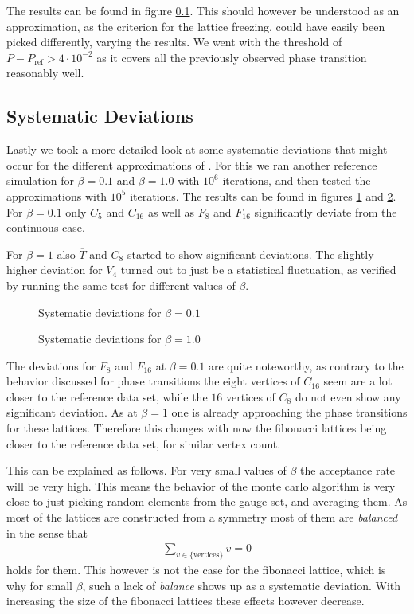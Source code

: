 The results can be found in figure \ref{}. This should however be understood as an approximation, as the criterion for the lattice freezing, could have easily been picked differently, varying the results. We went with the threshold of $P-P_{\textrm{ref}} > 4 \cdot 10^{-2}$ as it covers all the previously observed phase transition reasonably well.

\subsection{Systematic Deviations}
\FloatBarrier

Lastly we took a more detailed look at some systematic deviations that might occur for the different approximations of \SUTwo. For this we ran another reference simulation for $\beta = 0.1$ and $\beta = 1.0$ with $10^6$ iterations, and then tested the approximations with $10^5$ iterations. The results can be found in figures \ref{plot:systemBeta01} and \ref{plot:systemBeta10}. For $\beta=0.1$ only $C_5$ and $C_{16}$ as well as $F_{8}$ and $F_{16}$ significantly deviate from the continuous case.

For $\beta=1$ also $\overline{T}$ and $C_8$ started to show significant deviations. The slightly higher deviation for $V_4$ turned out to just be a statistical fluctuation, as verified by running the same test for different values of $\beta$.

\begin{figure}[!hbt]
 \centering
 
 \caption{Systematic deviations for $\beta = 0.1$}
 \label{plot:systemBeta01}
\end{figure}
\begin{figure}[!hbt]
 \centering
 
 \caption{Systematic deviations for $\beta = 1.0$}
 \label{plot:systemBeta10}
\end{figure}

The deviations for $F_8$ and $F_{16}$ at $\beta=0.1$ are quite noteworthy, as contrary to the behavior discussed for phase transitions the eight vertices of $C_{16}$ seem are a lot closer to the reference data set, while the $16$ vertices of $C_8$ do not even show any significant deviation. As at $\beta=1$ one is already approaching the phase transitions for these lattices. Therefore this changes with now the fibonacci lattices being closer to the reference data set, for similar vertex count.

This can be explained as follows. For very small values of $\beta$ the acceptance rate will be very high. This means the behavior of the monte carlo algorithm is very close to just picking random elements from the gauge set, and averaging them. As most of the lattices are constructed from a symmetry most of them are \emph{balanced} in the sense that
\begin{align*}
  \sum_{v \in \{\textrm{vertices}\}} v = 0
\end{align*}
holds for them. This however is not the case for the fibonacci lattice, which is why for small $\beta$, such a lack of \emph{balance} shows up as a systematic deviation. With increasing the size of the fibonacci lattices these effects however decrease.

\FloatBarrier
